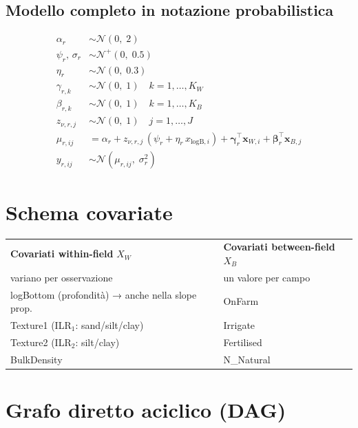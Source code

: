 \documentclass[11pt, a4paper]{article}
\newcommand{\N}{\mathcal{N}}
\newcommand{\HN}{\mathcal{N}^+}
\renewcommand{\vec}[1]{\bm{#1}}
\begin{document}
\subsection{Modello completo in notazione probabilistica}

\[
\begin{aligned}
\alpha_r &\sim \N(0,\;2) \\
\psi_r,\,\sigma_r &\sim \HN(0,\;0.5) \\
\eta_r &\sim \N(0,\;0.3) \\
\gamma_{r,k} &\sim \N(0,\;1) \quad k = 1,\ldots,K_W \\
\beta_{r,k} &\sim \N(0,\;1) \quad k = 1,\ldots,K_B \\
z_{\nu,r,j} &\sim \N(0,\;1) \quad j = 1,\ldots,J \\[4pt]
\mu_{r,ij} &= \alpha_r + z_{\nu,r,j}\,(\psi_r + \eta_r\,x_{\text{logB},i})
             + \vec{\gamma}_r^\top \vec{x}_{W,i}
             + \vec{\beta}_r^\top \vec{x}_{B,j} \\[4pt]
y_{r,ij} &\sim \N(\mu_{r,ij},\;\sigma_r^2)
\end{aligned}
\]

\section{Schema covariate}

\begin{center}
\begin{tabular}{@{}p{5.5cm}p{6.5cm}@{}}
\toprule
\textbf{Covariati within-field} $X_W$ & \textbf{Covariati between-field} $X_B$ \\
variano per osservazione & un valore per campo \\
\midrule
logBottom (profondità)\newline
\phantom{logBottom}→ anche nella slope prop. & OnFarm \\
Texture1 (ILR$_1$: sand/silt/clay) & Irrigate \\
Texture2 (ILR$_2$: silt/clay) & Fertilised \\
BulkDensity & N\_Natural \\
\bottomrule
\end{tabular}
\end{center}

\section{Grafo diretto aciclico (DAG)}
\end{document}
